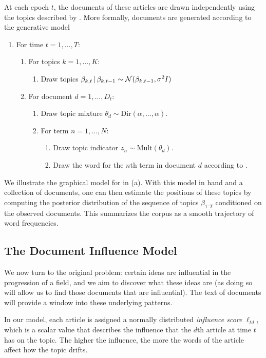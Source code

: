 At each epoch $t$, the documents of these articles are drawn independently
using the topics described by .  More formally, documents
are generated according to the generative model
\begin{enumerate}
\item For time $t=1, \ldots, T$:
  \begin{enumerate}
  \item For topics $k=1, \ldots, K$:
    \begin{enumerate}
    \item Draw topics $\beta_{k,t} \, | \, \beta_{k,t-1} \sim \mathcal{N}(\beta_{k,t-1}, \sigma^2 I)$
    \end{enumerate}
  \item For document $d=1, \ldots, D_t$:
    \begin{enumerate}
    \item Draw topic mixture $\theta_d \sim \mbox{Dir}(\alpha, \ldots, \alpha)$.
    \item For term $n=1, \ldots, N$:
      \begin{enumerate}
      \item Draw topic indicator $z_n \sim \mbox{Mult}(\theta_d)$.
      \item Draw the word for the $n$th term in document $d$ according to .
      \end{enumerate}
    \end{enumerate}
  \end{enumerate}
\end{enumerate}

We illustrate the graphical model for in  (a). With this
model in hand and a collection of documents, one can then estimate the
positions of these topics by computing the posterior distribution of
the sequence of topics $\beta_{1:T}$ conditioned on the observed
documents.  This summarizes the corpus as a smooth trajectory of word
frequencies.

\subsection*{The Document Influence Model}
We now turn to the original problem: certain ideas are influential in
the progression of a field, and we aim to discover what these ideas
are (as doing so will allow us to find those documents that are
influential).  The text of documents will provide a window into these
underlying patterns.

In our model, each article is assigned a normally distributed
\textit{influence score} $\ell_{td}$, which is a scalar value that
describes the influence that the $d$th article at time $t$ has on the
topic.  The higher the influence, the more the words of the article
affect how the topic drifts.

